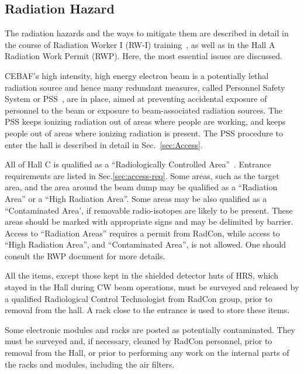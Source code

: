 \begin{safetyen}{0}{0}
\section{Radiation Hazard} 
\label{sec:radhazard}
\end{safetyen}
  The radiation hazards and the ways to mitigate them are described in detail in the
  course of Radiation Worker I (RW-I) training~\cite{RWIcebaf},
  as well as in the Hall A Radiation Work Permit (RWP).
  Here, the most essential issues are discussed.

  CEBAF's high intensity, high energy electron beam 
  is a potentially lethal radiation source and hence many redundant measures,
  called Personnel Safety System or PSS~\cite{PSScebaf}, are in place,
   aimed at preventing accidental exposure of personnel to the beam or exposure 
  to beam-associated radiation sources.
  The PSS keeps ionizing radiation out of areas where people are working,
  and keeps people out of areas where ionizing radiation is present. 
  The PSS procedure to enter the hall is described in detail in  Sec.~\ref{sec:Access}.


 All of Hall C is qualified as a ``Radiologically Controlled Area''~\cite{RWIcebaf}.
 Entrance requirements are listed in Sec.\ref{sec:access-req}.
 Some areas, such as the target area, and the area around the beam dump may be qualified as 
 a ``Radiation Area'' or a ``High Radiation Area''. Some areas may be also qualified 
 as a ``Contaminated Area', if removable radio-isotopes are likely to be present.
 These areas should be marked with appropriate signs and may be delimited by barrier. 
 Access to ``Radiation Areas'' requires a permit from RadCon, while access
 to ``High Radiation Area'', and ``Contaminated Area'', is not allowed. One should consult 
 the RWP document for more details.

 All the items, except those kept in the shielded detector huts of HRS,
          which stayed in the Hall during CW beam operations,
          must be surveyed and released by a qualified Radiological Control Technologist from
          RadCon group, prior to removal from the hall.
          A rack close to the entrance is used to store these items.

 Some electronic modules and racks are posted as potentially contaminated.
 They must be surveyed and, if necessary, cleaned by RadCon personnel,
 prior to removal from the Hall, or prior to performing any work on the internal parts of the racks
 and modules, including the air filters. 
 
